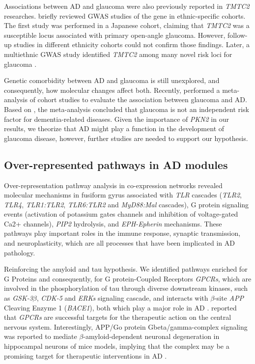 \documentclass[utf8]{FrontiersinHarvard} %
\begin{document}
Associations between AD and glaucoma were also previously reported in \textit{TMTC2} researches. \citet{eisenhaber2021conserved} briefly reviewed GWAS studies of the gene in ethnic-specific cohorts. The first study was performed in a Japanese cohort, claiming that \textit{TMTC2} was a susceptible locus associated with primary open-angle glaucoma. However, follow-up studies in different ethnicity cohorts could not confirm those findings. Later, a multiethnic GWAS study identified \textit{TMTC2} among many novel risk loci for glaucoma \citep{choquet2018multiethnic}.

Genetic comorbidity between AD and glaucoma is still unexplored, and consequently, how molecular changes affect both. Recently, \citet{zhao2021glaucoma} performed a meta-analysis of cohort studies to evaluate the association between glaucoma and AD. Based on \citet{zhao2021glaucoma}, the meta-analysis concluded that glaucoma is not an independent risk factor for dementia-related diseases. Given the importance of \textit{PKN2} in our results, we theorize that AD might play a function in the development of glaucoma disease, however, further studies are needed to support our hypothesis.

\subsection{Over-represented pathways in AD modules}

Over-representation pathway analysis in co-expression networks revealed molecular mechanisms in fusiform gyrus associated with \textit{TLR} cascades (\textit{TLR2}, \textit{TLR4}, \textit{TLR1:TLR2}, \textit{TLR6:TLR2} and \textit{MyD88:Mal} cascades), G protein signaling events (activation of potassium gates channels and inhibition of voltage-gated Ca2+ channels), \textit{PIP2} hydrolysis, and \textit{EPH-Epherin} mechanisms. These pathways play important roles in the immune response, synaptic transmission, and neuroplasticity, which are all processes that have been implicated in AD pathology. 

 Reinforcing the amyloid and tau hypothesis. We identified pathways enriched for G Proteins and consequently, for G protein-Coupled Receptors \textit{GPCRs}, which are involved in the phosphorylation of tau through diverse downstream kinases, such as \textit{GSK-3$\beta$}, \textit{CDK-5} and \textit{ERKs} signaling cascade, and interacts with $\beta$-site \textit{APP} Cleaving Enzyme 1 (\textit{BACE1}), both which play a major role in AD \citep{chidambaram2020g, zhao2016g, deyts2019app}. \citet{huang2017role} reported that \textit{GPCRs} are successful targets for the therapeutic action on the central nervous system. Interestingly, APP/Go protein Gbeta/gamma-complex signaling was reported to mediate $\beta$-amyloid-dependent neuronal degeneration in hippocampal neurons of mice models, implying that the complex may be a promising target for therapeutic interventions in AD \citep{bignante2018app}.
\end{document}
